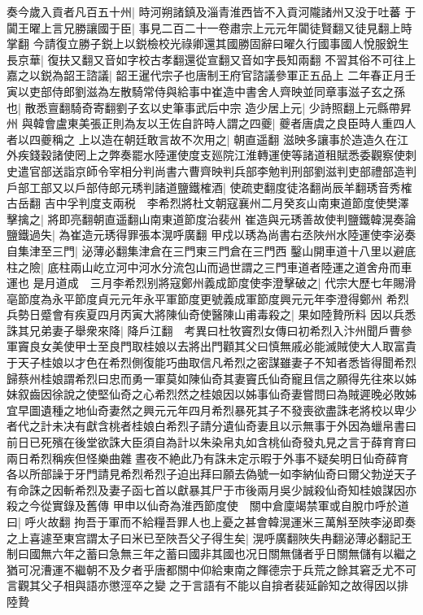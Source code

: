 奏今歲入貢者凡百五十州|{
	時河朔諸鎮及淄青淮西皆不入貢河隴諸州又没于吐蕃}
于闐王曜上言兄勝讓國于臣|{
	事見二百二十一卷肅宗上元元年闐徒賢翻又徒見翻上時掌翻}
今請復立勝子鋭上以鋭檢校光祿卿還其國勝固辭曰曜久行國事國人悅服銳生長京華|{
	復扶又翻又音如字校古孝翻還從宣翻又音如字長知兩翻}
不習其俗不可往上嘉之以鋭為韶王諮議|{
	韶王暹代宗子也唐制王府官諮議參軍正五品上}
二年春正月壬寅以吏部侍郎劉滋為左散騎常侍與給事中崔造中書舍人齊映並同章事滋子玄之孫也|{
	散悉亶翻騎奇寄翻劉子玄以史筆事武后中宗}
造少居上元|{
	少詩照翻上元縣帶昇州}
與韓會盧東美張正則為友以王佐自許時人謂之四夔|{
	夔者唐虞之良臣時人重四人者以四夔稱之}
上以造在朝廷敢言故不次用之|{
	朝直遥翻}
滋映多讓事於造造久在江外疾錢穀諸使罔上之弊奏罷水陸運使度支廵院江淮轉運使等諸道租賦悉委觀察使刺史遣官部送詣京師令宰相分判尚書六曹齊映判兵部李勉判刑部劉滋判吏部禮部造判戶部工部又以戶部侍郎元琇判諸道鹽鐵榷酒|{
	使疏吏翻度徒洛翻尚辰羊翻琇音秀榷古岳翻}
吉中孚判度支兩税　李希烈將杜文朝寇襄州二月癸亥山南東道節度使樊澤擊擒之|{
	將即亮翻朝直遥翻山南東道節度治裴州}
崔造與元琇善故使判鹽鐵韓滉奏論鹽鐵過失|{
	為崔造元琇得罪張本滉呼廣翻}
甲戍以琇為尚書右丞陜州水陸運使李泌奏自集津至三門|{
	泌薄必翻集津倉在三門東三門倉在三門西}
鑿山開車道十八里以避底柱之險|{
	底柱兩山屹立河中河水分流包山而過世謂之三門車道者陸運之道舍舟而車運也}
是月道成　三月李希烈别將寇鄭州義成節度使李澄擊破之|{
	代宗大歷七年賜滑亳節度為永平節度貞元元年永平軍節度更號義成軍節度興元元年李澄得鄭州}
希烈兵勢日蹙會有疾夏四月丙寅大將陳仙奇使醫陳山甫毒殺之|{
	果如陸贄所料}
因以兵悉誅其兄弟妻子舉衆來降|{
	降戶江翻　考異曰杜牧竇烈女傳曰初希烈入汴州聞戶曹參軍竇良女美使甲士至良門取桂娘以去將出門顴其父曰慎無戚必能滅賊使大人取富貴于天子桂娘以才色在希烈側復能巧曲取信凡希烈之密謀雖妻子不知者悉皆得聞希烈歸蔡州桂娘謂希烈曰忠而勇一軍莫如陳仙奇其妻竇氏仙奇寵且信之願得先往來以姊妹叙齒因徐說之使堅仙奇之心希烈然之桂娘因以姊事仙奇妻嘗問曰為賊遲晚必敗姊宜早圖遺種之地仙奇妻然之興元元年四月希烈暴死其子不發喪欲盡誅老將校以卑少者代之計未决有獻含桃者桂娘白希烈子請分遺仙奇妻且以示無事于外因為蠟帛書曰前日已死殯在後堂欲誅大臣須自為計以朱染帛丸如含桃仙奇發丸見之言于薛育育曰兩日希烈稱疾但怪樂曲雜晝夜不絶此乃有誅未定示暇于外事不疑矣明日仙奇薛育各以所部譟于牙門請見希烈希烈子迫出拜曰願去偽號一如李納仙奇曰爾父勃逆天子有命誅之因斬希烈及妻子函七首以獻暴其尸于市後兩月吳少誠殺仙奇知桂娘謀因亦殺之今從實錄及舊傳}
甲申以仙奇為淮西節度使　關中倉廩竭禁軍或自脫巾呼於道曰|{
	呼火故翻}
拘吾于軍而不給糧吾罪人也上憂之甚會韓滉運米三萬斛至陜李泌即奏之上喜遽至東宫謂太子曰米已至陜吾父子得生矣|{
	滉呼廣翻陜失冉翻泌薄必翻記王制曰國無六年之蓄曰急無三年之蓄曰國非其國也况日關無儲者乎日關無儲有以繼之猶可况漕運不繼朝不及夕者乎唐都關中仰給東南之餫德宗于兵荒之餘其窘乏尤不可言觀其父子相與語亦懲涇卒之變之于言語有不能以自揜者裴延齡知之故得因以排陸贄}

